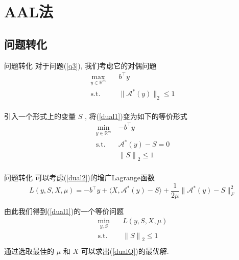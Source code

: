 \documentclass[slidestop,compress,mathserif,UTF8]{beamer}
\numberwithin{equation}{section}
\begin{document}
    \section{AAL法}\label{section2}
        \subsection{问题转化}
            \begin{frame}[t]{问题转化}
                对于问题(\ref{q3}), 我们考虑它的对偶问题
                \begin{equation}
                    \begin{split}\label{dual1}
                        \max_{y \in \mathbb{R}^{m}} \quad
                            & b^\top y\\
                        \text{s.t.} \quad
                            & \lVert{\mathcal{A}^*(y)}\rVert_2 \le 1\\
                    \end{split}
                \end{equation}

                引入一个形式上的变量 $S$ , 将(\ref{dual1})变为如下的等价形式
                \begin{equation}
                    \begin{split}\label{dual2}
                        \min_{y \in \mathbb{R}^{m}}
                            & -b^\top y\\
                        \text{s.t.} \quad
                            & \mathcal{A}^*(y) - S = 0\\
                            & {\lVert{S}\rVert}_2 \le 1\\
                    \end{split}
                \end{equation}
            \end{frame}
            \begin{frame}[t]{问题转化}
                可以考虑(\ref{dual2})的增广Lagrange函数
                \begin{equation}\label{Lag}
                        L(y, S, X, \mu)
                    =	-b^\top y + \langle{X, \mathcal{A}^*(y) - S}\rangle + \frac{1}{2\mu} \lVert{\mathcal{A}^*(y) - S}\rVert^2_F
                \end{equation}

                由此我们得到(\ref{dual1})的一个等价问题
                \begin{equation}
                    \begin{split}\label{dualQ}
                        \min_{y,S} \quad
                            & L(y, S, X, \mu)\\
                        \text{s.t.} \quad
                            & {\lVert{S}\rVert}_2 \le 1\\
                    \end{split}
                \end{equation}
                通过选取最佳的 $\mu$ 和 $X$ 可以求出(\ref{dualQ})的最优解.
            \end{frame}
\end{document}
